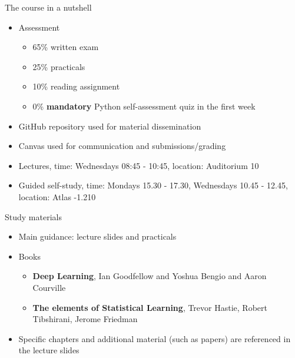 \documentclass[notes]{beamer}          %
\begin{document}
\begin{frame}{The course in a nutshell}
\begin{itemize}
    \item{Assessment}
        \begin{itemize}
            \item 65\% written exam
            \item 25\% practicals
            \item 10\% reading assignment
            \item 0\% \textbf{mandatory} Python self-assessment quiz in the first week
        \end{itemize}
    \item GitHub repository used for material dissemination
    \item Canvas used for communication and submissions/grading
    \item Lectures, time: Wednesdays 08:45 - 10:45, location: Auditorium 10
    \item Guided self-study, time: Mondays 15.30 - 17.30, Wednesdays 10.45 - 12.45, location: Atlas -1.210
    
\end{itemize}
\end{frame}

\begin{frame}{Study materials}
\begin{itemize}
\item Main guidance: lecture slides and practicals
\item Books
\begin{itemize}
    \item \textbf{Deep Learning}, Ian Goodfellow and Yoshua Bengio and Aaron Courville
    \item \textbf{The elements of Statistical Learning}, Trevor Hastie, Robert Tibshirani, Jerome Friedman
\end{itemize}
\item Specific chapters and additional material (such as papers) are referenced in the lecture slides
\end{itemize}
\end{frame}
\end{document}
